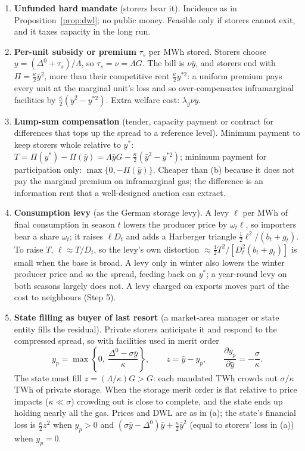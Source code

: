 \documentclass[11pt]{article}
\theoremstyle{definition}
\newcommand{\ybar}{\bar y}
\newcommand{\Dz}{\Delta^{0}}
\begin{document}
\begin{enumerate}[label=(\alph*)]
\item \textbf{Unfunded hard mandate} (storers bear it). Incidence as in Proposition~\ref{prop:dwl}; no
public money. Feasible only if storers cannot exit, and it taxes capacity in the long run.

\item \textbf{Per-unit subsidy or premium} $\tau_s$ per MWh stored. Storers choose $y=(\Dz+\tau_s)/\Lambda$,
so $\tau_s=\nu=\Lambda G$. The bill is $\nu\ybar$, and storers end with $\Pi=\frac{\kappa}{2}\ybar^2$, more than
their competitive rent $\frac\kappa2 y^{*2}$: a uniform premium pays every unit at the marginal unit's
loss and so over-compensates inframarginal facilities by $\frac{\kappa}{2}(\ybar^2-y^{*2})$. Extra welfare cost:
$\lambda_g\nu\ybar$.

\item \textbf{Lump-sum compensation} (tender, capacity payment or contract for differences that
tops up the spread to a reference level). Minimum payment to keep storers whole relative to $y^*$:
$T=\Pi(y^*)-\Pi(\ybar)=\Lambda\ybar G-\frac{\kappa}{2}(\ybar^2-y^{*2})$; minimum payment for participation only:
$\max\{0,-\Pi(\ybar)\}$. Cheaper than (b) because it does not pay the marginal premium on inframarginal gas;
the difference is an information rent that a well-designed auction can extract.

\item \textbf{Consumption levy} (as the German storage levy). A levy $\ell$ per MWh of final consumption in
season $t$ lowers the producer price by $\omega_t\ell$, so importers bear a share $\omega_t$; it raises
$\ell D_t$ and adds a Harberger triangle $\frac{1}{2}\ell^2/(b_t+g_t)$. To raise $T$, $\ell\approx T/D_t$, so the
levy's own distortion $\approx\frac12 T^2/[D_t^2(b_t+g_t)]$ is small when the base is broad. A levy only in
winter also lowers the winter producer price and so the spread, feeding back on $y^*$; a year-round levy
on both seasons largely does not. A levy charged on exports moves part of the cost to neighbours (Step 5).

\item \textbf{State filling as buyer of last resort} (a market-area manager or state entity fills the residual).
Private storers anticipate it and respond to the compressed spread, so with facilities used in merit order
\begin{equation}
y_p=\max\left\{0,\ \frac{\Dz-\sigma\ybar}{\kappa}\right\},\qquad z=\ybar-y_p,
\qquad \frac{\partial y_p}{\partial \ybar}=-\frac{\sigma}{\kappa}.
\end{equation}
The state must fill $z=(\Lambda/\kappa)G>G$: each mandated TWh crowds out $\sigma/\kappa$ TWh of private storage.
When the storage merit order is flat relative to price impacts ($\kappa\ll\sigma$) crowding out is close to complete,
and the state ends up holding nearly all the gas. Prices and DWL are as in (a); the state's financial loss is
$\frac{\kappa}{2}z^2$ when $y_p>0$ and $(\sigma\ybar-\Dz)\ybar+\frac\kappa2\ybar^2$ (equal to storers' loss in (a)) when
$y_p=0$.


\end{enumerate}
\end{document}
